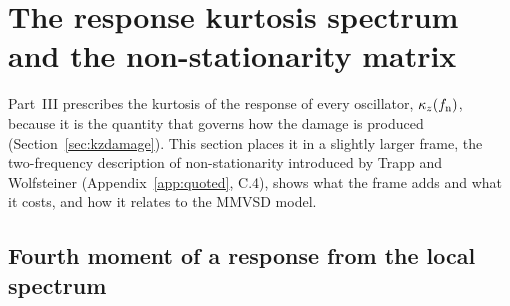 \section{The response kurtosis spectrum and the non-stationarity matrix}\label{sec:nsm}

Part~III prescribes the kurtosis of the response of every oscillator, $\kappa_z(f_{\mathrm{n}})$, because it is
the quantity that governs how the damage is produced (Section~\ref{sec:kzdamage}). This section places
it in a slightly larger frame, the two-frequency description of non-stationarity introduced by Trapp and
Wolfsteiner (Appendix~\ref{app:quoted}, C.4), shows what the frame adds and what it costs, and how it
relates to the MMVSD model.

\subsection{Fourth moment of a response from the local spectrum}

